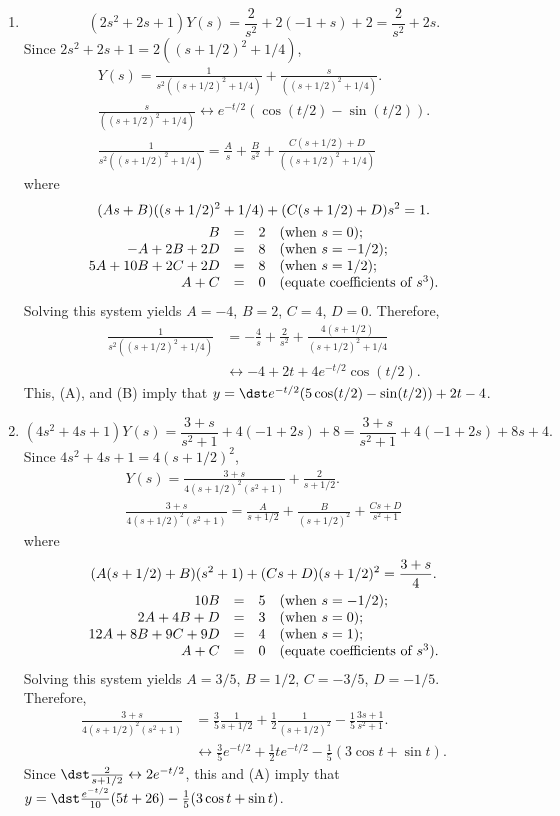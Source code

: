 \documentclass[openany]{book}
\newenvironment{sectionSolutions}{
 \begin{enumerate}[item-label={\thesection.\arabic{enumi}.}]
}{
 \end{enumerate}
}
\begin{document}
\begin{sectionSolutions}
\item
\[
(2s^2+2s+1)Y(s)=\frac{2}{ s^2}+2(-1+s)+2=\frac{2}{ s^2}+2s.
\]
Since $2s^2+2s+1=2((s+1/2)^2+1/4)$,
\begin{gather*}
Y(s)=\frac{1}{ s^2((s+1/2)^2+1/4)}+\frac{s}{((s+1/2)^2+1/4)}.
\tag{A}\\
\frac{s}{((s+1/2)^2+1/4)}\leftrightarrow
e^{-t/2}(\cos(t/2)-\sin(t/2)).
\tag{B}\\
 \frac{1}{ s^2((s+1/2)^2+1/4)}=\frac{A}{ s}+\frac{B}{ s^2}
+\frac{C(s+1/2)+D}{((s+1/2)^2+1/4)}
\end{gather*}
where
\begin{gather*}
(As+B)((s+1/2)^2+1/4)+(C(s+1/2)+D)s^2=1.
\\
\begin{array}{rc rl}
B&=&2&(\text{when }s=0);\\
-A+2B+2D&=&8& (\text{when }s=-1/2);\\
5A+10B+2C+2D&=&8& (\text{when }s=1/2);\\
A+C&=&0&(\text{equate coefficients of }s^3).
\end{array}
\end{gather*}
Solving this system yields $A=-4$, $B=2$,
$C=4$, $D=0$. Therefore,
\begin{align*}
\frac{1}{ s^2((s+1/2)^2+1/4)}
&=
-\frac{4}{ s}+\frac{2}{ s^2}
+\frac{4(s+1/2)}{(s+1/2)^2+1/4}
\\&\leftrightarrow
-4+2t+4e^{-t/2}\cos(t/2).
\end{align*}
This, (A), and (B) imply that
$y=\dst e^{-t/2}(5\cos(t/2)-\sin(t/2))+2t-4$.


\item
\[
(4s^2+4s+1)Y(s)=\frac{3+s}{ s^2+1}+4(-1+2s)+8=
\frac{3+s}{ s^2+1}+4(-1+2s)+8s+4.
\]
Since $4s^2+4s+1=4(s+1/2)^2$,
\begin{gather*}
Y(s)=
\frac{3+s}{4(s+1/2)^2(s^2+1)}+\frac{2}{ s+1/2}.
\tag{A}\\
\frac{3+s}{4(s+1/2)^2(s^2+1)}=\frac{A}{ s+1/2}+\frac{B}{(s+1/2)^2}
+\frac{Cs+D}{ s^2+1}
\end{gather*}
where
\begin{gather*}
(A(s+1/2)+B)(s^2+1)+(Cs+D)(s+1/2)^2=\frac{3+s}{4}.
\\
\begin{array}{rc rl}
10B&=&5&(\text{when }s=-1/2);\\
2A+4B+D&=&3& (\text{when }s=0);\\
12A+8B+9C+9D&=&4& (\text{when }s=1);\\
A+C&=&0&(\text{equate coefficients of }s^3).
\end{array}
\end{gather*}
Solving this system yields $A=3/5$, $B=1/2$,
$C=-3/5$, $D=-1/5$. Therefore,
\begin{align*}
\frac{3+s}{4(s+1/2)^2(s^2+1)}
&=
\frac{3}{5}\frac{1}{ s+1/2}+\frac{1}{2}\frac{1}{(s+1/2)^2}
-\frac{1}{5}\frac{3s+1}{ s^2+1}.
\\&\leftrightarrow
\frac{3}{5}e^{-t/2}+\frac{1}{2}te^{-t/2}-\frac{1}{5}(3\cos t+\sin t).
\end{align*}
Since $\dst\frac{2}{ s+1/2}\leftrightarrow2e^{-t/2}$, this and (A)
imply that
 $y=\dst\frac{e^{-t/2}}{10}(5t+26)-\frac{1}{5}(3\cos
t+\sin t)$.



\end{sectionSolutions}
\end{document}
